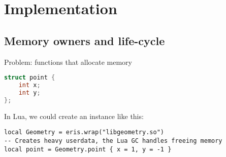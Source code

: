 
\chapter{Implementation}

\section{Memory owners and life-cycle}

Problem: functions that allocate memory

\begin{lstlisting}[language=c]
struct point {
	int x;
	int y;
};
\end{lstlisting}

In Lua, we could create an instance like this:

\begin{lstlisting}[language={[5.2]Lua}]
local Geometry = eris.wrap("libgeometry.so")
-- Creates heavy userdata, the Lua GC handles freeing memory
local point = Geometry.point { x = 1, y = -1 }
\end{lstlisting}

